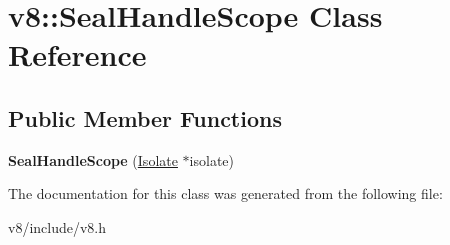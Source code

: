 \hypertarget{classv8_1_1SealHandleScope}{}\section{v8\+:\+:Seal\+Handle\+Scope Class Reference}
\label{classv8_1_1SealHandleScope}
\subsection*{Public Member Functions}
\begin{DoxyCompactItemize}
\item 
\hypertarget{classv8_1_1SealHandleScope_acfdab75cc53b53d3ba1a50ab5f4fe16e}{}{\bfseries Seal\+Handle\+Scope} (\hyperlink{classv8_1_1Isolate}{Isolate} $\ast$isolate)\label{classv8_1_1SealHandleScope_acfdab75cc53b53d3ba1a50ab5f4fe16e}

\end{DoxyCompactItemize}


The documentation for this class was generated from the following file\+:\begin{DoxyCompactItemize}
\item 
v8/include/v8.\+h\end{DoxyCompactItemize}
